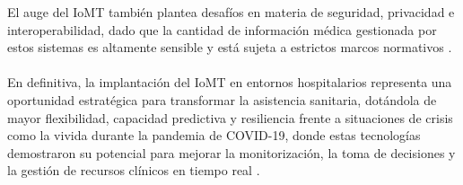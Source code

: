 El auge del IoMT también plantea desafíos en materia de seguridad, privacidad e interoperabilidad, dado que la cantidad de información médica gestionada por estos sistemas es altamente 
sensible y está sujeta a estrictos marcos normativos \cite{articulo3}. \\ \\

En definitiva, la implantación del IoMT en entornos hospitalarios representa una oportunidad estratégica para transformar la asistencia sanitaria, dotándola de mayor flexibilidad, 
capacidad predictiva y resiliencia frente a situaciones de crisis como la vivida durante la pandemia de COVID-19, donde estas tecnologías demostraron su potencial para mejorar la 
monitorización, la toma de decisiones y la gestión de recursos clínicos en tiempo real \cite{articulo3}.
